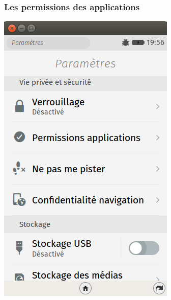 \documentclass{beamer}
\begin{document}
\begin{frame}
\frametitle{Les permissions des applications}
\begin{center}
\includegraphics[scale=0.5]{./images/Screenshot01.png}
\end{center}
\end{frame}
\end{document}
